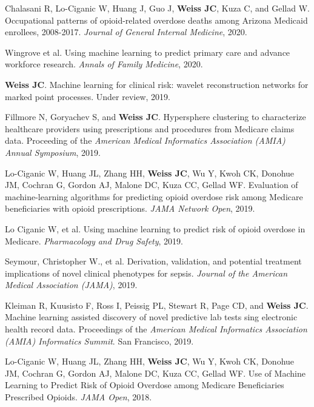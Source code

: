 \begin{bibsection}

\item  Chalasani R, Lo-Ciganic W, Huang J, Guo J, \textbf{Weiss JC}, Kuza C, and Gellad W. Occupational patterns of opioid-related overdose deaths among Arizona Medicaid enrollees, 2008-2017. \emph{Journal of General Internal Medicine}, 2020.

\item  Wingrove et al.  Using machine learning to predict primary care and advance workforce research. \emph{Annals of Family Medicine}, 2020. 

\item  \textbf{Weiss JC}. Machine learning for clinical risk: wavelet reconstruction networks for marked point processes. Under review, 2019.
  
\item  Fillmore N, Goryachev S, and \textbf{Weiss JC}. Hypersphere clustering to characterize healthcare providers using prescriptions and procedures from Medicare claims data. Proceeding of the \emph{American Medical Informatics Association (AMIA) Annual Symposium}, 2019.
  
\item  Lo-Ciganic W, Huang JL, Zhang HH, \textbf{Weiss JC}, Wu Y, Kwoh CK, Donohue JM, Cochran G, Gordon AJ, Malone DC, Kuza CC, Gellad WF. Evaluation of machine-learning algorithms for predicting opioid overdose risk among Medicare beneficiaries with opioid prescriptions. \emph{JAMA Network Open}, 2019.
  
\item  Lo Ciganic W, et al. Using machine learning to predict risk of opioid overdose in Medicare. \emph{Pharmacology and Drug Safety}, 2019. 

\item  Seymour, Christopher W., et al. Derivation, validation, and potential treatment implications of novel clinical phenotypes for sepsis. \emph{Journal of the American Medical Association (JAMA)}, 2019.

\item  Kleiman R, Kuusisto F, Ross I, Peissig PL, Stewart R, Page CD, and \textbf{Weiss JC}. Machine learning assisted discovery of novel predictive lab tests sing electronic health record data. Proceedings of the \emph{American Medical Informatics Association (AMIA) Informatics Summit}. San Francisco, 2019.

\item  Lo-Ciganic W, Huang JL, Zhang HH, \textbf{Weiss JC}, Wu Y, Kwoh CK, Donohue JM, Cochran G, Gordon AJ, Malone DC, Kuza CC, Gellad WF. Use of Machine Learning to Predict Risk of Opioid Overdose among Medicare Beneficiaries Prescribed Opioids. \emph{JAMA Open}, 2018.
  

\end{bibsection}

